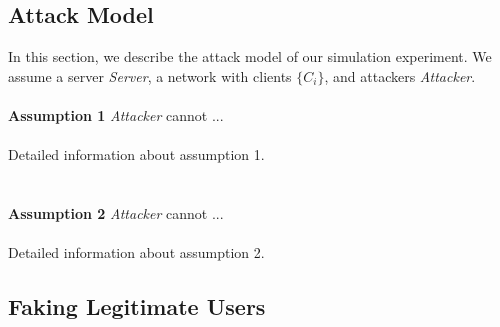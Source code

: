 \subsection{Attack Model}
In this section, we describe the attack model of our simulation experiment. We assume a server \emph{Server}, a network with clients \emph{$\{C_i\}$}, and attackers \emph{Attacker}.
\\
\\
\noindent \textbf{Assumption 1} \indent \emph{Attacker} cannot ...
\\
\\
Detailed information about assumption 1.
\\
\\
\\
\noindent \textbf{Assumption 2} \indent \emph{Attacker} cannot ...
\\
\\
Detailed information about assumption 2.

\subsection{Faking Legitimate Users}

